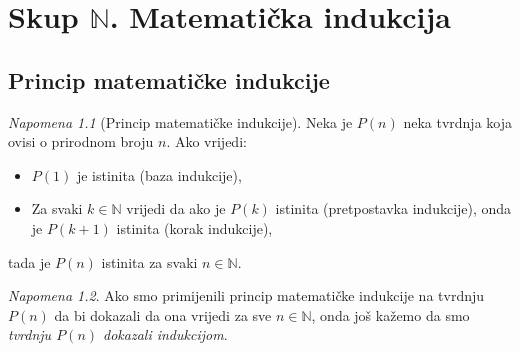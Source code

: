 \documentclass{book}
\theoremstyle{definition}
\theoremstyle{definition}
\theoremstyle{remark}
\newtheorem{remark}{Napomena}
\begin{document}
\chapter{Skup \texorpdfstring{$\mathbb{N}$}{N}. Matematička indukcija}
\fancyhead[RO, RE]{}
\section{Princip matematičke indukcije}
\begin{remark}[Princip matematičke indukcije]
\label{20}
Neka je $P(n)$ neka tvrdnja koja ovisi o prirodnom broju $n$. Ako vrijedi:
\begin{itemize}
\item $P(1)$ je istinita (baza indukcije),
\item Za svaki $k\in \mathbb{N}$ vrijedi da ako je $P(k)$ istinita (pretpostavka indukcije), onda je $P(k+1)$ istinita (korak indukcije),
\end{itemize}
tada je $P(n)$ istinita za svaki $n\in \mathbb{N}$.
\end{remark}

\begin{remark}
\label{22}
Ako smo primijenili princip matematičke indukcije na tvrdnju $P(n)$ da bi dokazali da ona vrijedi za sve $n\in \mathbb{N}$, onda još kažemo da smo \textit{tvrdnju $P(n)$ dokazali indukcijom}.
\end{remark}
\end{document}
